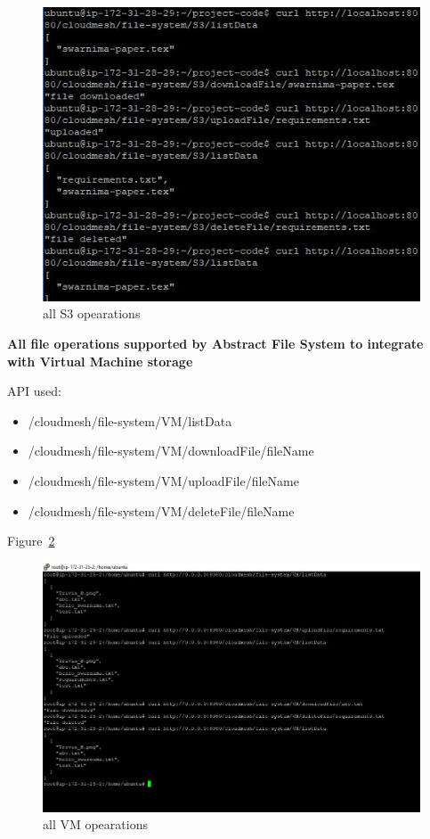 \begin{figure}[!ht]
        \centering\includegraphics[width=\columnwidth]
        {image/all-s3.JPG}
        \caption{all S3 opearations}\label{fig:all-s3}
\end{figure}


\textbf{All file operations supported by Abstract File System to integrate 
with Virtual Machine storage}


API used:
\begin{itemize}
    \item /cloudmesh/file-system/VM/listData
    \item /cloudmesh/file-system/VM/downloadFile/{fileName}
    \item /cloudmesh/file-system/VM/uploadFile/{fileName}
    \item /cloudmesh/file-system/VM/deleteFile/{fileName}
\end{itemize}

Figure~\ref{fig:VM}

\begin{figure}[!ht]
        \centering\includegraphics[width=\columnwidth]
        {image/VM.JPG}
        \caption{all VM opearations}\label{fig:VM}
\end{figure}


